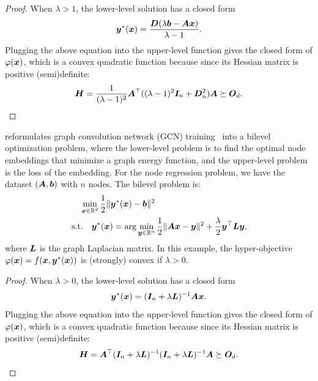 \begin{proof}
When $\lambda >1$, the lower-level solution has a closed form
\begin{align*}
    {\bm{y}}^*({\bm{x}}) = \frac{{\bm{D}}  (\lambda {\bm{b}} - {\bm{A}}  {\bm{x}})}{\lambda -1}.
\end{align*}
Plugging the above equation into the upper-level function gives the closed form of $\varphi({\bm{x}})$, which is a convex quadratic function because since its Hessian matrix is positive (semi)definite:
\begin{align*}
    {\bm{H}} = \frac{1}{(\lambda-1)^2}  {\bm{A}}^\top ( (\lambda -1)^2 {\bm{I}}_n + {\bm{D}}_n^2 ) {\bm{A}} \succeq {\bm{O}}_d.
\end{align*}
\end{proof}

\begin{exmp}
    \citet{yang2021graph} reformulates graph convolution network (GCN) training~\citep{kipf2016semi} into a bilevel optimization problem, where the lower-level problem is to find the optimal node embeddings that minimize a graph energy function, and the upper-level problem is the loss of the embedding. For the node regression problem, we have the dataset $({\bm{A}},{\bm{b}})$ with $n$ nodes. The bilevel problem is:
    \begin{align*}
        &\quad \min_{{\bm{x}} \in {\mathbb{R}}^d} \frac{1}{2} \Vert {\bm{y}}^*({\bm{x}}) - {\bm{b}} \Vert^2 \\
        &{\rm s.t.} \quad {\bm{y}}^*({\bm{x}}) = \arg \min_{{\bm{y}} \in {\mathbb{R}}^{n}} \frac{1}{2} \Vert {\bm{A}} {\bm{x}} - {\bm{y}} \Vert^2 + \frac{\lambda}{2} {\bm{y}}^\top {\bm{L}} {\bm{y}},
    \end{align*}
where $ {\bm{L}}$ is the graph Laplacian matrix. In this example, the hyper-objective $\varphi({\bm{x}}) = f({\bm{x}},{\bm{y}}^*({\bm{x}}))$ is (strongly) convex if $\lambda>0$.
\end{exmp}

\begin{proof}
When $\lambda >0$, the lower-level solution has a closed form 
\begin{align*}
    {\bm{y}}^*({\bm{x}}) = ({\bm{I}}_n + \lambda {\bm{L}})^{-1} {\bm{A}} {\bm{x}}.
\end{align*}
Plugging the above equation into the upper-level function gives the closed form of $\varphi({\bm{x}})$, which is a convex quadratic function because since its Hessian matrix is positive (semi)definite:
\begin{align*}
    {\bm{H}} = {\bm{A}}^\top ({\bm{I}}_n + \lambda {\bm{L}})^{-1} ({\bm{I}}_n + \lambda {\bm{L}})^{-1} {\bm{A}} \succeq {\bm{O}}_d.
\end{align*}
\end{proof}

